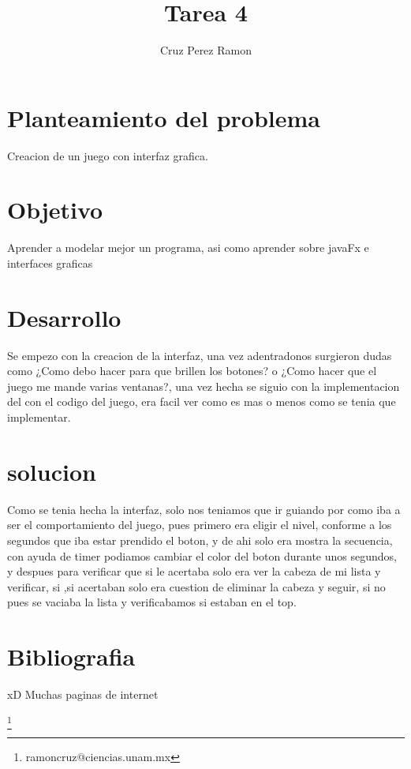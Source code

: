 \documentclass[12pt]{article}
\title{Tarea 4}
\author{Cruz Perez Ramon}
\begin{document}
\maketitle

\section{Planteamiento del problema}
Creacion de un juego con interfaz grafica.

\section{Objetivo}
Aprender a modelar mejor un programa, asi como aprender sobre javaFx e interfaces graficas

\section{Desarrollo}
Se empezo con la creacion de la interfaz, una vez adentradonos surgieron dudas como ¿Como debo hacer para que brillen los botones? o ¿Como hacer que el juego me mande varias ventanas?, una vez hecha se siguio con la implementacion del con el codigo del juego, era facil ver como es mas o menos como se tenia que implementar.

\section{solucion}
Como se tenia hecha la interfaz, solo nos teniamos que ir guiando por como iba a ser el comportamiento del juego, pues primero era eligir el nivel, conforme a los segundos que iba estar prendido el boton, y de ahi solo era mostra la secuencia, con ayuda de timer podiamos cambiar el color del boton durante unos segundos, y despues para verificar que si le acertaba solo era ver la cabeza de mi lista y verificar, si ,si acertaban solo era cuestion de eliminar la cabeza y seguir, si no pues se vaciaba la lista y verificabamos si estaban en el top.

\section{Bibliografia}
xD Muchas paginas de internet

\footnote{ramoncruz@ciencias.unam.mx}
\end{document}
